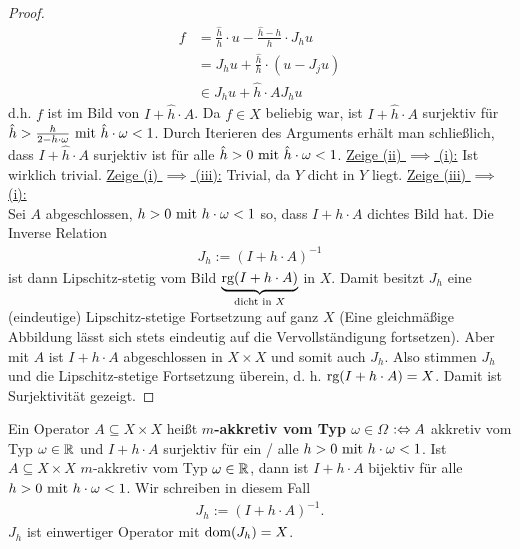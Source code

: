 \begin{proof}
\begin{align*}
f&=\frac{\hat{h}}{h}\cdot u-\frac{\hat{h}-h}{h}\cdot J_h u\\
&=J_h u+\frac{\hat{h}}{h}\cdot\left(u-J_j u\right)\\
&\in J_h u+\hat{h}\cdot A J_h u
\end{align*}
d.h. $f$ ist im Bild von $I+\hat{h}\cdot A$. Da $f\in X$ beliebig war, ist $I+\hat{h}\cdot A$ surjektiv für $\hat{h}>\frac{h}{2-h\cdot\omega}\mit \hat{h}\cdot\omega<1$. Durch Iterieren des Arguments erhält man schließlich, dass $I+\hat{h}\cdot A$ surjektiv ist für alle $\hat{h}>0\mit\hat{h}\cdot\omega<1$.\nl
\underline{Zeige (ii) $\implies$ (i):} Ist wirklich trivial.\nl
\underline{Zeige (i) $\implies$ (iii):} Trivial, da $Y$ dicht in $Y$ liegt.\nl
\underline{Zeige (iii) $\implies$ (i):}\\
Sei $A$ abgeschlossen, $h>0\mit h\cdot\omega<1$ so, dass $I+h\cdot A$ dichtes Bild hat. Die Inverse Relation
\begin{align*}
J_h:=(I+h\cdot A)^{-1}
\end{align*}
ist dann Lipschitz-stetig vom Bild $\underbrace{\rg(I+h\cdot A)}_{\text{dicht in }X}$ in $X$. Damit besitzt $J_h$ eine (eindeutige) Lipschitz-stetige Fortsetzung auf ganz $X$ (Eine gleichmäßige Abbildung lässt sich stets eindeutig auf die Vervollständigung fortsetzen). Aber mit $A$ ist $I+h\cdot A$ abgeschlossen in $X\times X$ und somit auch $J_h$. Also stimmen $J_h$ und die Lipschitz-stetige Fortsetzung überein, d. h. $\rg(I+h\cdot A)=X$. Damit ist Surjektivität gezeigt.
\end{proof}

\begin{definition}
Ein Operator $A\subseteq X\times X$ heißt \textbf{$m$-akkretiv vom Typ $\omega\in\Omega$} $:\gdw\\ A$ akkretiv vom Typ $\omega\in\R$ und $I+h\cdot A$ surjektiv für ein / alle $h>0\mit h\cdot\omega<1$.\nl
Ist $A\subseteq X\times X$  $m$-akkretiv vom Typ $\omega\in\R$, dann ist $I+h\cdot A$ bijektiv für alle $h>0\mit h\cdot\omega<1$. Wir schreiben in diesem Fall
\begin{align*}
J_h:=(I+h\cdot A)^{-1}.
\end{align*}
$J_h$ ist einwertiger Operator mit $\dom(J_h)=X$.
\end{definition}

